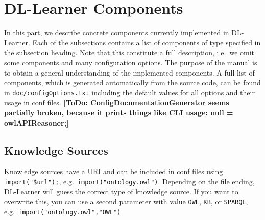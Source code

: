 \documentclass[a4paper,12pt]{scrartcl}
\newcommand{\todo}[1]{\textbf{[ToDo: #1]}}
\begin{document}
\section{DL-Learner Components}
\label{sec:components}

In this part, we describe concrete components currently implemented in DL-Learner. Each of the subsections contains a list of components of type specified in the subsection heading. Note that this constitute a full description, i.e.~we omit some components and many configuration options. The purpose of the manual is to obtain a general understanding of the implemented components. A full list of components, which is generated automatically from the source code, can be found in \verb|doc/configOptions.txt| including the default values for all options and their usage in conf files. \todo{ConfigDocumentationGenerator seems partially broken, because it prints things like CLI usage: null = owlAPIReasoner;}

\subsection{Knowledge Sources}

Knowledge sources have a URI and can be included in conf files using \verb|import("$url");|, e.g.~\verb|import("ontology.owl")|. Depending on the file ending, DL-Learner will guess the correct type of knowledge source. If you want to overwrite this, you can use a second parameter with value \verb|OWL|, \verb|KB|, or \verb|SPARQL|, e.g.~\verb|import("ontology.owl","OWL")|.
\end{document}
